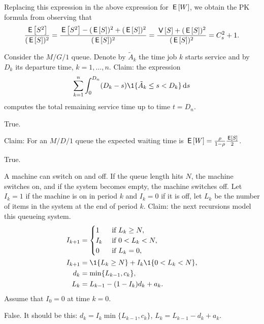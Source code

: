 \documentclass[stochastic-or.tex]{subfiles}
\begin{document}
Replacing this expression in the above expression for $\,\mathsf{E}\left[W\right]$, we obtain the PK formula from observing that
\begin{equation*}
\frac{\,\mathsf{E}\left[S^2\right]}{(\,\mathsf{E}\left[S\right])^2} =  \frac{\,\mathsf{E}\left[S^2\right] - (\,\mathsf{E}\left[S\right])^{2} + (\,\mathsf{E}\left[S\right])^{2}}{(\,\mathsf{E}\left[S\right])^2} = \frac{\,\mathsf{V}\left[S\right] + (\,\mathsf{E}\left[S\right])^{2}}{(\,\mathsf{E}\left[S\right])^{2}} = C_s^2 +1.
\end{equation*}



\begin{truefalse}
Consider the $M/G/1$ queue.
Denote by $\tilde{A}_k$ the time job $k$ starts service and by $D_k$ its departure time, $k=1,\ldots,n$.
Claim: the expression
\begin{equation*}
\sum_{k=1}^{n} \int_0^{D_n} (D_k-s)\1{\tilde A_k \leq s < D_k} \d s
\end{equation*}
computes the total remaining service time up to time $t = D_n$.
\begin{solution}
True.
\end{solution}
\end{truefalse}


\begin{truefalse}
Claim: For an $M/D/1$ queue the expected waiting time is $\,\mathsf{E}\left[W\right]=\frac{\rho}{1-\rho}\frac{\,\mathsf{E}\left[S\right]}{2}$.
    \begin{solution}
        True.
    \end{solution}
\end{truefalse}

\begin{truefalse}[5.6]
A machine can switch on and off.
If the queue length hits $N$, the machine switches on, and if the system becomes empty, the machine switches off.
Let $I_k=1$ if the machine is on in period $k$ and $I_k=0$ if it is off, let $L_k$ be the number of items in the system at the end of period $k$.
Claim: the next recursions model this queueing system.
 \begin{align*}
 I_{k+1} &=
 \begin{cases}
 1 & \text{ if } L_{k} \geq N,\\
 I_k & \text{ if } 0< L_{k} <N,\\
 0 & \text{ if } L_{k} =0,\\
 \end{cases}\\
 I_{k+1} &= \1{L_k\geq N} + I_k \1{0<L_k<N}, \\
d_k &=\min\{L_{k-1}, c_k\}, \\
L_k &= L_{k-1} - (1-I_k) d_k + a_k.
 \end{align*}
 Assume that $I_0 =0$ at time $k=0$.
\begin{solution}
 False.
It should be this: $d_k =I_k \min\{L_{k-1}, c_k\}$, $L_k = L_{k-1} - d_k + a_k$.
\end{solution}
\end{truefalse}
\end{document}
